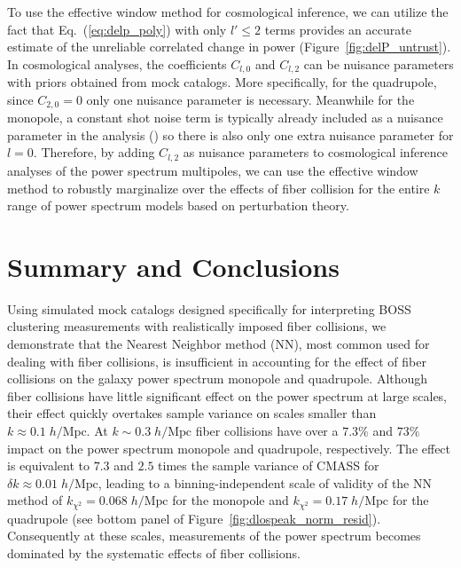 To use the effective window method for cosmological inference, we can 
utilize the fact that Eq.~(\ref{eq:delp_poly}) with only $l' \leq 2$ terms 
provides an accurate estimate of the unreliable correlated change in power (Figure~\ref{fig:delP_untrust}). In cosmological analyses, the coefficients $C_{l, 0}$ and $C_{l, 2}$
can be nuisance parameters with priors obtained from  
mock catalogs. More specifically, for the quadrupole, since $C_{2, 0} = 0$
only one nuisance parameter is necessary. Meanwhile 
for the monopole, a constant shot noise term is typically already included as
a nuisance parameter in the analysis (\citealt{Beutler:2014aa,Beutler:2016aa,Grieb:2016aa,Gil-Marin:2016aa}) so there is 
also only one extra nuisance parameter for $l=0$. Therefore, 
by adding $C_{l, 2}$ as nuisance parameters to cosmological inference 
analyses of the power spectrum multipoles, we can use the effective window 
method to robustly marginalize over the effects of fiber collision for the 
entire $k$ range of power spectrum models based on perturbation theory. 

\section{Summary and Conclusions} \label{sec:summary}
Using simulated mock catalogs designed specifically for interpreting BOSS 
clustering measurements with realistically imposed fiber collisions, we 
demonstrate that the Nearest Neighbor method (NN), most common used for dealing 
with fiber collisions, is insufficient in accounting for the effect of 
fiber collisions on the galaxy power spectrum monopole and quadrupole.  
Although fiber collisions have little significant effect on 
the power spectrum at large scales, their effect quickly overtakes sample 
variance on scales smaller than $k \approx 0.1 \;h/\mathrm{Mpc}$. At  $k \sim 0.3 \;h/\mathrm{Mpc}$
fiber collisions have over a $7.3\%$ and $73\%$ 
impact on the power spectrum monopole and quadrupole, respectively. The 
effect is equivalent to $7.3$ and $2.5$ times the sample variance of CMASS for 
$\delta k \approx 0.01\;h/\mathrm{Mpc}$, leading to a binning-independent scale of validity of the NN method of 
$k_{\chi^2}=0.068\;h/\mathrm{Mpc}$ for the monopole and $k_{\chi^2}=0.17\;h/\mathrm{Mpc}$ for the 
quadrupole (see bottom panel of Figure~\ref{fig:dlospeak_norm_resid}).  
Consequently at these scales, measurements of the power spectrum becomes 
dominated by the systematic effects of fiber collisions. 

